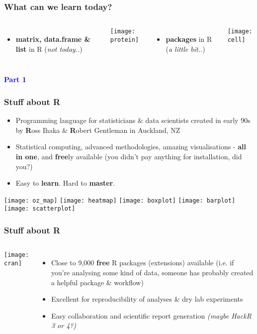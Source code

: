 \documentclass[13pt,aspectratio=169]{beamer}\usepackage[]{graphicx}\usepackage[]{color}
\newcommand{\tc}[2]{\textcolor{#1}{#2}}
\begin{document}
\begin{frame}
    \frametitle{What can we learn today?}
    \begin{columns}[t]
	\begin{itemize}
	    \item \textbf{matrix, data.frame \& list} in R
		\alert{(\textit{not today..})}
	\end{itemize}
	\vskip14pt
	\texttt{[image: protein]}
	\begin{itemize}
	    \item \textbf{packages} in R
		\alert{(\textit{a little bit..})}
	\end{itemize}
	\vskip14pt
	\texttt{[image: cell]}
    \end{columns}
\end{frame}

\begin{frame}
    \begin{center}
	\tc{Blue}{\textbf{\Huge{Part 1}}}
    \end{center}
\end{frame}

\begin{frame}
    \frametitle{Stuff about R}
	\begin{itemize}
	    \item Programming language for statisticians \& data scientists
		created in early 90s by \textbf{R}oss Ihaka \&
		\textbf{R}obert Gentleman in Auckland, NZ
	    \item Statistical computing, advanced methodologies,
		amazing visualisations - \textbf{all in one}, and
		\textbf{free}ly available (you didn't pay anything for
		installation, did you?)
	    \item Easy to \textbf{learn}. Hard to \textbf{master}.
	\end{itemize}
	\texttt{[image: oz\_map]}
	\texttt{[image: heatmap]}
	\texttt{[image: boxplot]}
	\texttt{[image: barplot]}
	\texttt{[image: scatterplot]}
\end{frame}

\begin{frame}
    \frametitle{Stuff about R}
    \begin{columns}
	\texttt{[image: cran]}
	\begin{itemize}
	    \item Close to 9,000 \textbf{free} R packages (extensions)
		available (i.e. if you're analysing some kind of data, someone
		has probably created a helpful package \& workflow)
		\vskip10pt
	    \item Excellent for reproducibility of analyses \& dry
		lab experiments
		\vskip10pt
	    \item Easy collaboration and scientific report generation
		\textit{(maybe HackR 3 or 4?)}
	\end{itemize}
	\end{columns}
\end{frame}
\end{document}
